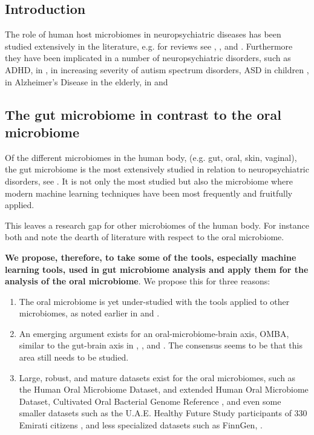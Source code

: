 \documentclass{article}
\begin{document}
\begin{multicols}{2}
\section{Introduction}
The role of human host microbiomes in neuropsychiatric diseases has been studied extensively in the literature, e.g. for reviews see \cite{goswami_role_2021}, \cite{hashimoto_emerging_2023}, and \cite{bonnechere}. Furthermore they have been implicated in a number of neuropsychiatric disorders, such as ADHD, in \cite{bull-larsen_potential_2019}, in increasing severity of autism spectrum disorders, ASD in children \cite{TOMOVA2015179}, in Alzheimer's Disease in the elderly, in \cite{yk_microbiota-gut-brain_2018} and \cite{escobar_influence_2022}
\subsection{The gut microbiome in contrast to the oral microbiome}
Of the different microbiomes in the human body, (e.g. gut, oral, skin, vaginal), the gut microbiome is the most extensively studied in relation to neuropsychiatric disorders, see \cite{sorboni_comprehensive_2022}. It is not only the most studied but also the microbiome where modern machine learning techniques have been most frequently and fruitfully applied. 

This leaves a research gap for other microbiomes of the human body. For instance both \cite{goswami_role_2021} and \cite{tao_relationship_2024} note the dearth of literature with respect to the oral microbiome.

\textbf{We propose, therefore, to take some of the tools, especially machine learning tools, used in gut microbiome analysis and apply them for the analysis of the oral microbiome}. We propose this for three reasons:

\begin{enumerate}[label = \roman*.]
	\item The oral microbiome is yet under-studied with the tools applied to other microbiomes, as noted earlier in \cite{goswami_role_2021} and \cite{tao_relationship_2024}.
	\item An emerging argument exists for an oral-microbiome-brain axis, OMBA, similar to the gut-brain axis in \cite{bowland_oral-microbiome-brain_2022}, \cite{xi_coming_2024}, and \cite{y_did_2020}. The consensus seems to be that this area still needs to be studied.
	\item Large, robust, and mature datasets exist for the oral microbiomes, such as the Human Oral Microbiome Dataset, and extended Human Oral Microbiome Dataset\cite{homd}, Cultivated Oral Bacterial Genome Reference \cite{li_catalog_2023}, and even some smaller datasets such as the U.A.E. Healthy Future Study participants of 330 Emirati citizens \cite{noauthor_human_nodate}, and less specialized datasets such as FinnGen, \cite{noauthor_finngen_nodate}.
\end{enumerate}

\end{multicols}
\end{document}

